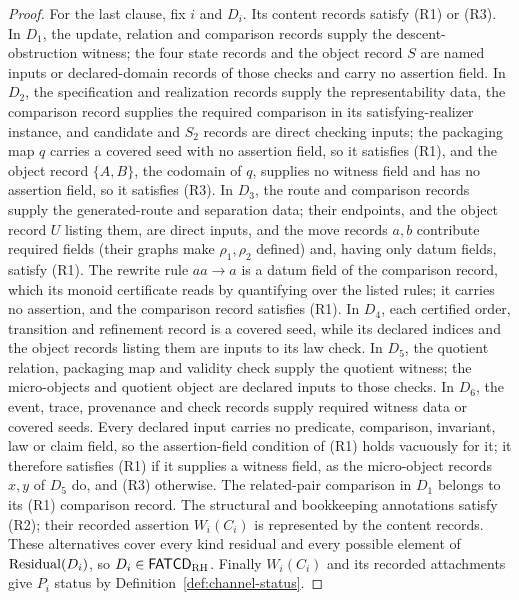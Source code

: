 \begin{proof}
For the last clause, fix \(i\) and \(D_i\). Its content records satisfy (R1)
or (R3). In \(D_1\), the update, relation and comparison records supply the
descent-obstruction witness; the four state records and the object record
\(S\) are named inputs or declared-domain records of those checks and carry no assertion field. In \(D_2\), the specification and realization
records supply the representability data, the comparison record supplies the
required comparison in its satisfying-realizer instance, and candidate and \(S_2\) records are direct checking
inputs; the packaging map
\(q\) carries a covered \Pfive{} seed with no assertion field, so it satisfies
(R1), and the object record \(\{A,B\}\), the codomain of \(q\), supplies no
witness field and has no assertion field, so it satisfies (R3). In \(D_3\), the route and
comparison records supply the generated-route and separation data; their
endpoints, and the object record \(U\) listing them, are direct inputs, and the move records \(a,b\) contribute required
fields (their graphs make \(\rho_1,\rho_2\) defined) and, having only datum
fields, satisfy (R1). The rewrite rule \(aa\to a\) is a datum field of the comparison record,
which its monoid certificate reads by quantifying over the listed rules; it
carries no assertion, and the comparison record satisfies (R1). In \(D_4\), each certified order, transition and
refinement record is a covered \Pfour{} seed, while its declared indices and
the object records listing them are inputs to its law check. In \(D_5\), the quotient relation, packaging map and
validity check supply the quotient witness; the micro-objects and quotient
object are declared inputs to those checks. In \(D_6\), the event, trace,
provenance and check records supply required witness data or covered
\Psix{} seeds. Every declared input carries no predicate, comparison,
invariant, law or claim field, so the assertion-field condition of (R1) holds
vacuously for it; it therefore satisfies (R1) if it supplies a witness field,
as the micro-object records \(x,y\) of \(D_5\) do, and (R3) otherwise. The
related-pair comparison in \(D_1\) belongs to its (R1) comparison record. The
structural and bookkeeping annotations satisfy (R2); their recorded assertion
\(W_i(C_i)\) is represented by the content records. These alternatives cover
every kind residual and every possible element of \(\operatorname{Residual}\!\left(D_i\right)\), so
\(D_i\in\mathsf{FATCD}_{\mathrm{RH}}\). Finally \(W_i(C_i)\) and its recorded
attachments give \(P_i\) status \activeproj{} by
Definition~\ref{def:channel-status}.
\end{proof}

